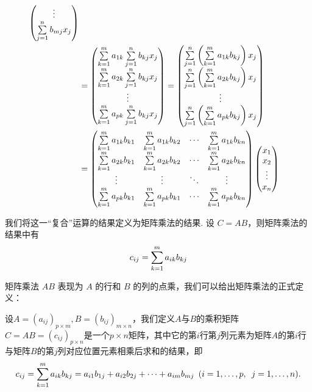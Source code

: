 \begin{align*}
\begin{pmatrix}
        \vdots \\
        \sum_{j=1}^n\limits b_{mj} x_j
    \end{pmatrix} \\
    &= \begin{pmatrix}
        \sum_{k=1}^m\limits a_{1k} \sum_{j=1}^n\limits b_{kj} x_j \\
        \sum_{k=1}^m\limits a_{2k} \sum_{j=1}^n\limits b_{kj} x_j \\
        \vdots \\
        \sum_{k=1}^m\limits a_{pk} \sum_{j=1}^n\limits b_{kj} x_j
    \end{pmatrix} = \begin{pmatrix}
        \sum\limits_{j=1}^n\left(\sum\limits_{k=1}^m a_{1k} b_{kj}\right) x_j \\
        \sum\limits_{j=1}^n\left(\sum\limits_{k=1}^m a_{2k} b_{kj}\right) x_j \\
        \vdots \\
        \sum\limits_{j=1}^n\left(\sum\limits_{k=1}^m a_{pk} b_{kj}\right) x_j
    \end{pmatrix} \\
    &= \begin{pmatrix}
        \sum_{k=1}^m\limits a_{1k} b_{k1} & \sum_{k=1}^m\limits a_{1k} b_{k2} & \cdots & \sum_{k=1}^m\limits a_{1k} b_{kn} \\
        \sum_{k=1}^m\limits a_{2k} b_{k1} & \sum_{k=1}^m\limits a_{2k} b_{k2} & \cdots & \sum_{k=1}^m\limits a_{2k} b_{kn} \\
        \vdots & \vdots & \ddots & \vdots \\
        \sum_{k=1}^m\limits a_{pk} b_{k1} & \sum_{k=1}^m\limits a_{pk} b_{k1} & \cdots & \sum_{k=1}^m\limits a_{pk} b_{kn}
    \end{pmatrix} \begin{pmatrix}
        x_1 \\ x_2 \\ \vdots \\ x_n
    \end{pmatrix}\\
\end{align*}

我们将这一``复合''运算的结果定义为矩阵乘法的结果. 设 $C = AB$，则矩阵乘法的结果中有
\[
    c_{ij} = \sum_{k=1}^m\limits a_{ik} b_{kj}
\]

矩阵乘法 $AB$ 表现为 $A$ 的行和 $B$ 的列的点乘，我们可以给出矩阵乘法的正式定义：
\begin{definition}{}{}
    设$A=(a_{ij})_{p\times m},B=(b_{ij})_{m\times n}$，我们定义$A$与$B$的乘积矩阵$C=AB=(c_{ij})_{p\times n}$是一个$p\times n$矩阵，其中它的第$i$行第$j$列元素为矩阵$A$的第$i$行与矩阵$B$的第$j$列对应位置元素相乘后求和的结果，即
    \[
        c_{ij}
        =\sum_{k=1}^m\limits a_{ik} b_{kj}
        =a_{i1}b_{1j}+a_{i2}b_{2j}+\cdots+a_{im}b_{mj}\enspace(i=1,\ldots,p,\enspace j=1,\ldots,n).
    \]
\end{definition}

